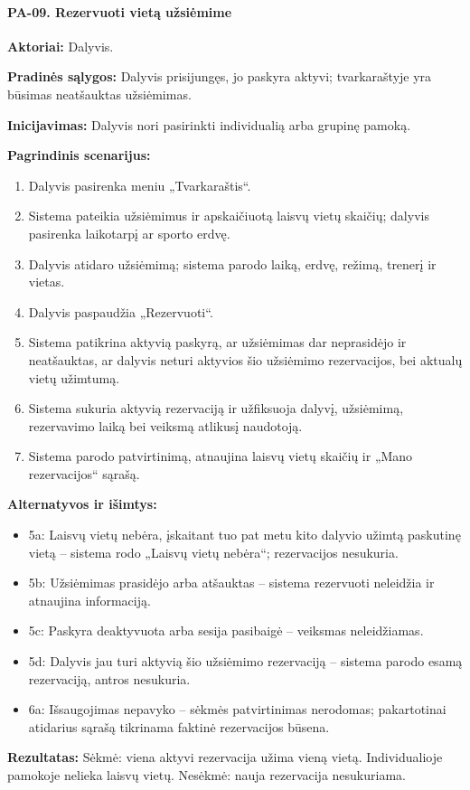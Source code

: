 \paragraph{PA-09. Rezervuoti vietą užsiėmime}\mbox{}\par
\textbf{Aktoriai:} Dalyvis.\par
\textbf{Pradinės sąlygos:} Dalyvis prisijungęs, jo paskyra aktyvi; tvarkaraštyje yra būsimas neatšauktas užsiėmimas.\par
\textbf{Inicijavimas:} Dalyvis nori pasirinkti individualią arba grupinę pamoką.\par
\textbf{Pagrindinis scenarijus:}
\begin{enumerate}
\item Dalyvis pasirenka meniu „Tvarkaraštis“.
\item Sistema pateikia užsiėmimus ir apskaičiuotą laisvų vietų skaičių; dalyvis pasirenka laikotarpį ar sporto erdvę.
\item Dalyvis atidaro užsiėmimą; sistema parodo laiką, erdvę, režimą, trenerį ir vietas.
\item Dalyvis paspaudžia „Rezervuoti“.
\item Sistema patikrina aktyvią paskyrą, ar užsiėmimas dar neprasidėjo ir neatšauktas, ar dalyvis neturi aktyvios šio užsiėmimo rezervacijos, bei aktualų vietų užimtumą.
\item Sistema sukuria aktyvią rezervaciją ir užfiksuoja dalyvį, užsiėmimą, rezervavimo laiką bei veiksmą atlikusį naudotoją.
\item Sistema parodo patvirtinimą, atnaujina laisvų vietų skaičių ir „Mano rezervacijos“ sąrašą.
\end{enumerate}
\textbf{Alternatyvos ir išimtys:}
\begin{itemize}
\item 5a: Laisvų vietų nebėra, įskaitant tuo pat metu kito dalyvio užimtą paskutinę vietą -- sistema rodo „Laisvų vietų nebėra“; rezervacijos nesukuria.
\item 5b: Užsiėmimas prasidėjo arba atšauktas -- sistema rezervuoti neleidžia ir atnaujina informaciją.
\item 5c: Paskyra deaktyvuota arba sesija pasibaigė -- veiksmas neleidžiamas.
\item 5d: Dalyvis jau turi aktyvią šio užsiėmimo rezervaciją -- sistema parodo esamą rezervaciją, antros nesukuria.
\item 6a: Išsaugojimas nepavyko -- sėkmės patvirtinimas nerodomas; pakartotinai atidarius sąrašą tikrinama faktinė rezervacijos būsena.
\end{itemize}
\textbf{Rezultatas:} Sėkmė: viena aktyvi rezervacija užima vieną vietą. Individualioje pamokoje nelieka laisvų vietų. Nesėkmė: nauja rezervacija nesukuriama.\par
\clearpage
{}
